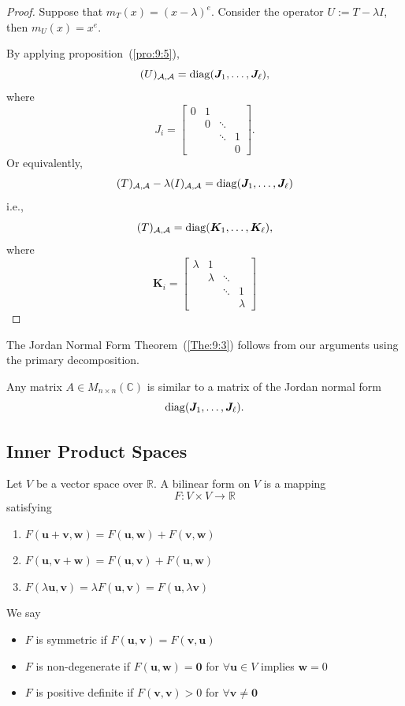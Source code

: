 \begin{proof}
Suppose that $m_T(x) = (x-\lambda)^e$. Consider the operator $U:=T-\lambda I$, then $m_U(x) = x^e$.

By applying proposition~(\ref{pro:9:5}), 
\[
(U)_{\mathcal{A},\mathcal{A}}=\operatorname{diag}(\bm J_1,\dots,\bm J_\ell),
\]
where 
\[
J_i=\begin{bmatrix}
0& 1            & \;     & \;  \\
\;        & 0    & \ddots & \;  \\
\;        & \;           & \ddots & 1   \\
\;        & \;           & \;     &0
\end{bmatrix}.
\]
Or equivalently,
\[
(T)_{\mathcal{A},\mathcal{A}}-\lambda(I)_{\mathcal{A},\mathcal{A}}=\operatorname{diag}(\bm J_1,\dots,\bm J_\ell)
\]
i.e.,
\[
(T)_{\mathcal{A},\mathcal{A}}=\operatorname{diag}(\bm K_1,\dots,\bm K_\ell),
\]
where
\[
\bm K_i=\begin{bmatrix}
\lambda& 1            & \;     & \;  \\
\;        & \lambda    & \ddots & \;  \\
\;        & \;           & \ddots & 1   \\
\;        & \;           & \;     &\lambda
\end{bmatrix}
\]
\end{proof}
\begin{remark}
The Jordan Normal Form Theorem~(\ref{The:9:3}) follows from our arguments using the primary decomposition.
\end{remark}


\begin{corollary}
Any matrix $A\in M_{n\times n}(\mathbb{C})$ is similar to a matrix of the Jordan normal form
\[
\operatorname{diag}(\bm J_1,\dots,\bm J_\ell).
\]
\end{corollary}

\subsection{Inner Product Spaces}
\begin{definition}[Bilinear]
Let $V$ be a vector space over $\mathbb{R}$.
A bilinear form on $V$ is a mapping
\[
F:V\times V\to\mathbb{R}
\]
satisfying
\begin{enumerate}
\item
$F(\bm u+\bm v,\bm w) = F(\bm u,\bm w)+F(\bm v,\bm w)$
\item
$F(\bm u,\bm v+\bm w)= F(\bm u,\bm v)+F(\bm u,\bm w)$
\item
$F(\lambda\bm u,\bm v)=\lambda F(\bm u,\bm v)=F(\bm u,\lambda\bm v)$
\end{enumerate}
We say 
\begin{itemize}
\item
$F$ is symmetric if $F(\bm u,\bm v)=F(\bm v,\bm u)$
\item
$F$ is non-degenerate if $F(\bm u,\bm w)=\bm0$ for $\forall \bm u\in V$ implies $\bm w=0$
\item
$F$ is positive definite if $F(\bm v,\bm v)>0$ for $\forall\bm v\ne\bm0$
\end{itemize}
\end{definition}


